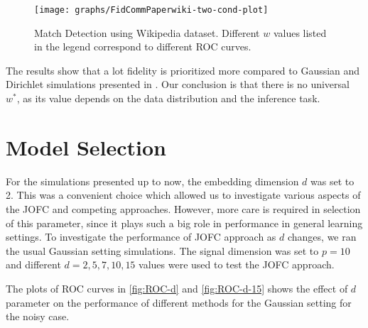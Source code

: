 \documentclass[12pt,oneside,final]{thesis}\usepackage[]{graphicx}\usepackage[]{color}
\begin{document}
\begin{figure}
 \centering
\texttt{[image: graphs/FidCommPaperwiki-two-cond-plot]}
\caption{Match Detection using Wikipedia dataset. Different $w$ values listed in the legend correspond to different ROC curves.}
\end{figure}

The results show that a lot fidelity is prioritized more compared to Gaussian and Dirichlet simulations presented in \label{sec:Simulation Results}. Our conclusion is that there is no universal $w^*$, as its value depends on the data distribution and the inference task.


\section{Model Selection}
For the simulations presented up to now, the embedding dimension $d$ was set to 2. This was a convenient choice which allowed us to investigate various aspects of the JOFC and competing approaches.
However,  more care is required in selection of this parameter, since it plays such a big role in performance in general learning settings. To investigate the performance of JOFC approach as $d$ changes, we ran the usual Gaussian setting simulations. The signal dimension was set to $p=10$ and different $d=2,5,7,10,15$ values were used to test the JOFC approach.

The  plots of ROC curves in    \ref{fig:ROC-d} and  \ref{fig:ROC-d-15} shows the effect of $d$ parameter on the performance of different methods for the Gaussian setting for the noisy case.
\end{document}
